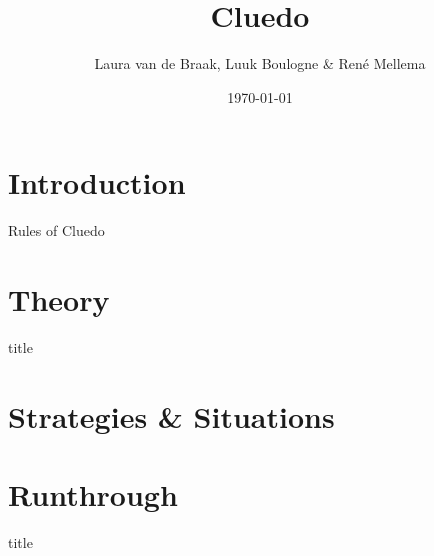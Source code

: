 \documentclass{beamer}
\title{Cluedo}
\author{Laura van de Braak, Luuk Boulogne \& Ren\'e Mellema}
\date{\today}
\begin{document}
\begin{frame}
    \titlepage
\end{frame}

\begin{frame}[Content]
  \tableofcontents
\end{frame}

\section{Introduction}

\begin{frame}{Rules of Cluedo}
  
\end{frame}

\section{Theory}

\begin{frame}{title}

\end{frame}

\section{Strategies \& Situations}


\section{Runthrough}

\begin{frame}{title}

\end{frame}
\end{document}
